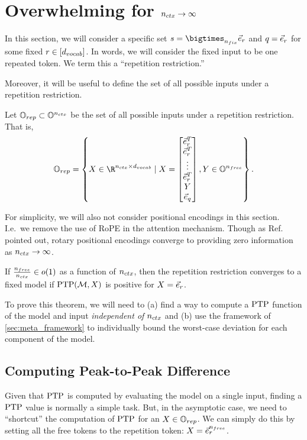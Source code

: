 \section{Overwhelming for ${n_{ctx}} \to \infty$}
\label{sec:convergence}

In this section, we will consider a specific set $\desSet = \bigtimes_{\nfix} \vecRep$ and $q = \vec{e}_r$ for some fixed $r \in [{d_{vocab}}]$.
In words, we will consider the fixed input to be one repeated token.
We term this a ``repetition restriction.''

Moreover, it will be useful to define the set of all possible inputs under a repetition restriction.
\begin{definition}
	\label{def:RepSpace}
	Let $\mathbb{O}_{rep} \subset \mathbb{O}^{n_{ctx}}$ be the set of all possible inputs under a repetition restriction.
	That is, 
	\[
		\RepSpace = \left\{ X \in \R^{\nctx \times \dVocab} \mid X = 
		\begin{bmatrix}
			\vecRep^T \\
			\vecRep^T \\
			\vdots \\
			\vecRep^T \\
			Y \\
			\vecQuery
		\end{bmatrix}, Y \in \OneHotSpace^{\nfree}
		\right\}.
	\]
\end{definition}

For simplicity, we will also not consider positional encodings in this section. 
I.e.\ we remove the use of RoPE in the attention mechanism.
Though as Ref.~\cite{barbero2024transformers} pointed out, rotary positional encodings \cite{su2024roformer} converge to providing zero information as ${n_{ctx}} \to \infty$.

\begin{theorem}
	\label{thm:convergence}
	If $\frac{n_{free}}{{n_{ctx}}} \in o(1)$ as a function of ${n_{ctx}}$, then the repetition restriction converges to a fixed model if $\mathrm{PTP}(\mathcal{M}, X)$ is positive for $X = \vec{e}_r$.
\end{theorem}

To prove this theorem, we will need to (a) find a way to compute a $\mathrm{PTP}$ function of the model and input \emph{independent of} ${n_{ctx}}$ and (b) use the framework of \cref{sec:meta_framework} to individually bound the worst-case deviation for each component of the model.

\subsection*{Computing Peak-to-Peak Difference}
Given that $\mathrm{PTP}$ is computed by evaluating the model on a single input, finding a $\mathrm{PTP}$ value is normally a simple task.
But, in the asymptotic case, we need to ``shortcut'' the computation of $\mathrm{PTP}$ for an $X \in \mathbb{O}_{rep}$.
We can simply do this by setting all the free tokens to the repetition token: $X = {\vec{e}_r}^{n_{free}}$.

